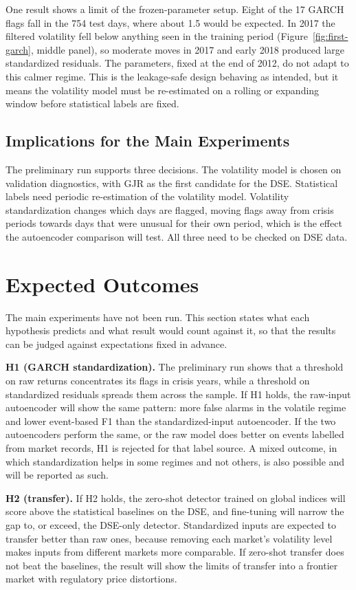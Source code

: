 One result shows a limit of the frozen-parameter setup. Eight of the 17 GARCH flags fall
in the 754 test days, where about 1.5 would be expected. In 2017 the filtered volatility
fell below anything seen in the training period (Figure~\ref{fig:first-garch}, middle
panel), so moderate moves in 2017 and early 2018 produced large standardized residuals. The
parameters, fixed at the end of 2012, do not adapt to this calmer regime. This is the
leakage-safe design behaving as intended, but it means the volatility model must be re-estimated on a rolling or expanding
window before statistical labels are fixed.

\subsection{Implications for the Main Experiments}
The preliminary run supports three decisions. The volatility model is chosen on validation
diagnostics, with GJR as the first candidate for the DSE. Statistical labels need periodic
re-estimation of the volatility model. Volatility standardization changes which days are
flagged, moving flags away from crisis periods towards days that were unusual for their own
period, which is the effect the autoencoder comparison will test. All three need to be
checked on DSE data.

\section{Expected Outcomes}
The main experiments have not been run. This section states what each hypothesis predicts
and what result would count against it, so that the results can be judged against
expectations fixed in advance.

\textbf{H1 (GARCH standardization).} The preliminary run shows that a threshold on raw
returns concentrates its flags in crisis years, while a threshold on standardized residuals
spreads them across the sample. If H1 holds, the raw-input autoencoder will show the same
pattern: more false alarms in the volatile regime and lower event-based F1 than the
standardized-input autoencoder. If the two autoencoders perform the same, or the raw model
does better on events labelled from market records, H1 is rejected for that label source.
A mixed outcome, in which standardization helps in some regimes and not others, is also
possible and will be reported as such.

\textbf{H2 (transfer).} If H2 holds, the zero-shot detector trained on global indices will
score above the statistical baselines on the DSE, and fine-tuning will narrow the gap to,
or exceed, the DSE-only detector. Standardized inputs are expected to transfer better than
raw ones, because removing each market's volatility level makes inputs from different
markets more comparable. If zero-shot transfer does not beat the baselines, the result will
show the limits of transfer into a frontier market with regulatory price distortions.

